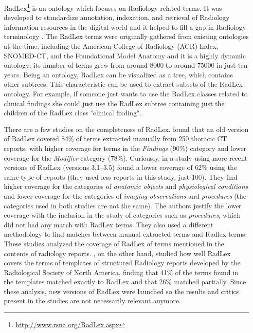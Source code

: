 RadLex\footnote{\url{http://www.rsna.org/RadLex.aspx}} is an ontology which focuses on Radiology-related terms. It was developed to standardize annotation, indexation, and retrieval of Radiology information resources in the digital world \citep{Langlotz2006} and it helped to fill a gap in Radiology terminology \citep{Langlotz2002, Woods2013}. The RadLex terms were originally gathered from existing ontologies at the time, including the American College of Radiology (ACR) Index, SNOMED-CT, and the Foundational Model Anatomy and it is a highly dynamic ontology: its number of terms grew from around 8000 to around 75000 in just ten years. Being an ontology, RadLex can be visualized as a tree, which contains other subtrees. This characteristic can be used to extract subsets of the RadLex ontology. For example, if someone just wants to use the RadLex classes related to clinical findings she could just use the RadLex subtree containing just the children of the RadLex class "clinical finding".

There are a few studies on the completeness of RadLex. \citep{Marwede2008} found that an old version of RadLex covered 84\% of terms extracted manually from 250 thoracic CT reports, with higher coverage for terms in the \textit{Findings} (90\%) category and lower coverage for the \textit{Modifier} category (78\%). Curiously, in a study using more recent versions of RadLex (versions 3.1–3.5) \citep{Woods2013} found a lower coverage of 62\% using the same type of reports (they used less reports in this study, just 100). They find higher coverage for the categories of \textit{anatomic objects} and \textit{physiological conditions} and lower coverage for the categories of \textit{imaging observations} and \textit{procedures} (the categories used in both studies are not the same). The authors justify the lower coverage with the inclusion in the study of categories such as \textit{procedures}, which did not had any match with RadLex terms. They also used a different methodology to find matches between manual extracted terms and Radlex terms. These studies analyzed the coverage of RadLex of terms mentioned in the contents of radiology reports. \citep{Hong2012}, on the other hand, studied how well RadLex covers the terms of templates of structured Radiology reports developed by the Radiological Society of North America, finding that 41\% of the terms found in the templates matched exactly to RadLex and that 26\% matched partially. Since these analysis, new versions of RadLex were launched so the results and critics present in the studies are not necessarily relevant anymore.

